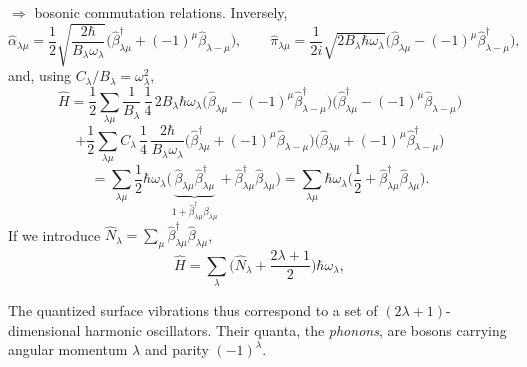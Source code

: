 \documentclass[11pt,a4paper]{article}
\newcommand{\op}[1]{\hat{#1}}
\begin{document}
$\Rightarrow$ bosonic commutation relations. Inversely,
\[
\op\alpha_{\lambda\mu}=\frac12\sqrt{\frac{2\hbar}{B_\lambda\omega_\lambda}}\Big(\op\beta^\dagger_{\lambda\mu}+(-1)^\mu\op\beta_{\lambda-\mu}\Big),
\qquad
\op\pi_{\lambda\mu}=\frac{1}{2i}\sqrt{2B_\lambda\hbar\omega_\lambda}\Big(\op\beta_{\lambda\mu}-(-1)^\mu\op\beta^\dagger_{\lambda-\mu}\Big),
\]
and, using $C_\lambda/B_\lambda=\omega_\lambda^2$,
\[
\op H=\frac12\sum_{\lambda\mu}\frac{1}{B_\lambda}\,\frac14\,2B_\lambda\hbar\omega_\lambda\Big(\op\beta_{\lambda\mu}-(-1)^\mu\op\beta^\dagger_{\lambda-\mu}\Big)\Big(\op\beta^\dagger_{\lambda\mu}-(-1)^\mu\op\beta_{\lambda-\mu}\Big)
\]
\[
+\frac12\sum_{\lambda\mu}C_\lambda\,\frac14\,\frac{2\hbar}{B_\lambda\omega_\lambda}\Big(\op\beta^\dagger_{\lambda\mu}+(-1)^\mu\op\beta_{\lambda-\mu}\Big)\Big(\op\beta_{\lambda\mu}+(-1)^\mu\op\beta^\dagger_{\lambda-\mu}\Big)
\]
\[
=\sum_{\lambda\mu}\frac12\hbar\omega_\lambda\Big(\underbrace{\op\beta_{\lambda\mu}\op\beta^\dagger_{\lambda\mu}}_{1+\op\beta^\dagger_{\lambda\mu}\op\beta_{\lambda\mu}}+\op\beta^\dagger_{\lambda\mu}\op\beta_{\lambda\mu}\Big)
=\sum_{\lambda\mu}\hbar\omega_\lambda\Big(\frac12+\op\beta^\dagger_{\lambda\mu}\op\beta_{\lambda\mu}\Big).
\]
If we introduce $\op N_\lambda=\sum_\mu\op\beta^\dagger_{\lambda\mu}\op\beta_{\lambda\mu}$,
\[
\op H=\sum_\lambda\Big(\op N_\lambda+\frac{2\lambda+1}{2}\Big)\hbar\omega_\lambda ,
\]

The quantized surface vibrations thus correspond to a set of $(2\lambda+1)$-dimensional harmonic oscillators. Their quanta, the \emph{phonons}, are bosons carrying angular momentum $\lambda$ and parity $(-1)^\lambda$.
\end{document}

